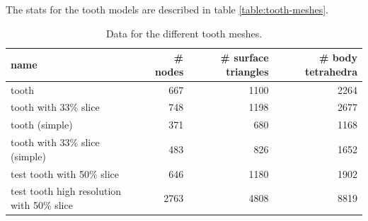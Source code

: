 The stats for the tooth models are described in table
\vref{table:tooth-meshes}.

\begin{table}
  \centering
  \begin{tabular}{| l | r | r | r |}
    \hline
    name & \# nodes & \# surface triangles & \# body tetrahedra \\
    \hline
    tooth & 667 & 1100 & 2264 \\ 
    tooth with 33\% slice & 748 & 1198 & 2677 \\ 
    tooth (simple)                  & 371 & 680 & 1168   \\
    tooth with 33\% slice (simple)  & 483 & 826 &  1652  \\
    test tooth with 50\% slice & 646 & 1180 & 1902 \\
    test tooth high resolution with 50\% slice & 2763 & 4808 & 8819 \\
    \hline
  \end{tabular}
  \caption{Data for the different tooth meshes.}
  \label{table:tooth-meshes}
\end{table}


